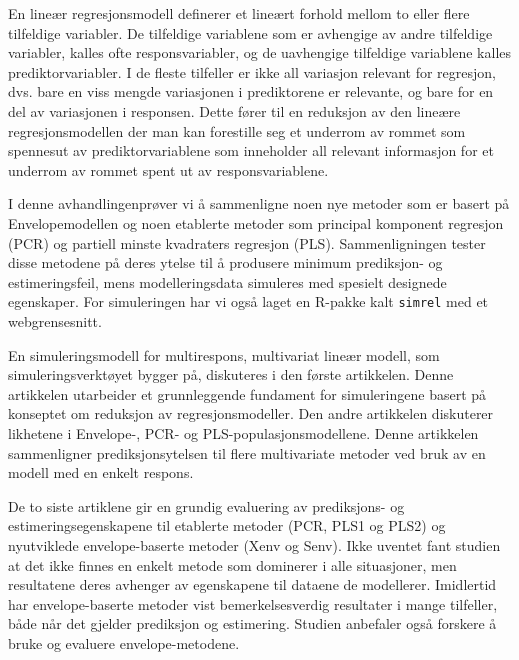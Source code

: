 En lineær regresjonsmodell definerer et lineært forhold mellom to eller
flere tilfeldige variabler. De tilfeldige variablene som er avhengige av
andre tilfeldige variabler, kalles ofte responsvariabler, og de
uavhengige tilfeldige variablene kalles prediktorvariabler. I de fleste
tilfeller er ikke all variasjon relevant for regresjon, dvs. bare en
viss mengde variasjonen i prediktorene er relevante, og bare for en del
av variasjonen i responsen. Dette fører til en reduksjon av den lineære
regresjonsmodellen der man kan forestille seg et underrom av rommet som
spennesut av prediktorvariablene som inneholder all relevant informasjon
for et underrom av rommet spent ut av responsvariablene.

I denne avhandlingenprøver vi å sammenligne noen nye metoder som er
basert på Envelopemodellen og noen etablerte metoder som principal
komponent regresjon (PCR) og partiell minste kvadraters regresjon (PLS).
Sammenligningen tester disse metodene på deres ytelse til å produsere
minimum prediksjon- og estimeringsfeil, mens modelleringsdata simuleres
med spesielt designede egenskaper. For simuleringen har vi også laget en
R-pakke kalt \texttt{simrel} med et webgrensesnitt.

En simuleringsmodell for multirespons, multivariat lineær modell, som
simuleringsverktøyet bygger på, diskuteres i den første artikkelen.
Denne artikkelen utarbeider et grunnleggende fundament for simuleringene
basert på konseptet om reduksjon av regresjonsmodeller. Den andre
artikkelen diskuterer likhetene i Envelope-, PCR- og
PLS-populasjonsmodellene. Denne artikkelen sammenligner
prediksjonsytelsen til flere multivariate metoder ved bruk av en modell
med en enkelt respons.

De to siste artiklene gir en grundig evaluering av prediksjons- og
estimeringsegenskapene til etablerte metoder (PCR, PLS1 og PLS2) og
nyutviklede envelope-baserte metoder (Xenv og Senv). Ikke uventet fant
studien at det ikke finnes en enkelt metode som dominerer i alle
situasjoner, men resultatene deres avhenger av egenskapene til dataene
de modellerer. Imidlertid har envelope-baserte metoder vist
bemerkelsesverdig resultater i mange tilfeller, både når det gjelder
prediksjon og estimering. Studien anbefaler også forskere å bruke og
evaluere envelope-metodene.
